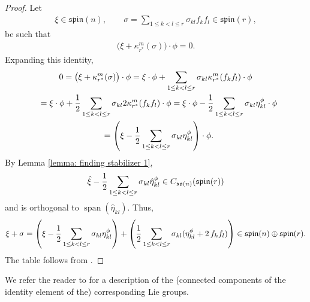 \documentclass[10pt,a4paper]{amsart}
\numberwithin{equation}{section}
\begin{document}
\begin{proof} Let
\begin{gather*}
 \xi \in \mathfrak{spin}(n),\qquad
 \sigma = \sum_{1\leq k<l\leq r} \sigma_{kl}f_kf_l \in\mathfrak{spin}(r),
\end{gather*}
be such that
\begin{gather*}\big(\xi+\kappa_{r^*}^{m} (\sigma)\big)\cdot \phi =0.\end{gather*}
Expanding this identity,
\begin{gather*}
 0 = \big(\xi+\kappa_{r^*}^{m} (\sigma)\big)\cdot \phi =
 \xi\cdot\phi + \sum_{1\leq k<l\leq r} \sigma_{kl}\kappa_{r^*}^{m}(f_kf_l)\cdot\phi\\
 \hphantom{0}{} =
 \xi\cdot\phi + {1\over 2}\sum_{1\leq k<l\leq r} \sigma_{kl}2\kappa_{r^*}^{m}(f_kf_l)\cdot\phi =
 \xi\cdot\phi - {1\over 2}\sum_{1\leq k<l\leq r} \sigma_{kl}\eta_{kl}^\phi\cdot\phi\\
\hphantom{0}{} =
 \left(\xi - {1\over 2}\sum_{1\leq k<l\leq r} \sigma_{kl}\eta_{kl}^\phi\right)\cdot\phi.
\end{gather*}
By Lemma \ref{lemma: finding stabilizer 1},
\begin{gather*}\hat{\xi} - {1\over 2}\sum_{1\leq k<l\leq r} \sigma_{kl}\hat{\eta}_{kl}^\phi\in C_{\mathfrak{so}(n)}(\mathfrak{spin}(r))\end{gather*}
and is orthogonal to $\operatorname{span}(\hat{\eta}_{kl})$.
Thus,
\begin{gather*}\xi+\sigma = \left(\xi - {1\over 2}\sum_{1\leq k<l\leq r} \sigma_{kl}\eta_{kl}^\phi\right) + \left({1\over 2}\sum_{1\leq k<l\leq r} \sigma_{kl}(\eta_{kl}^\phi + 2\,f_kf_l)\right) \in \mathfrak{spin}(n)\oplus\mathfrak{spin}(r).\end{gather*}
The table follows from \cite[Theorems 3.1 and 3.2]{AH}.
\end{proof}

We refer the reader to \cite[Theorem 3.2]{AGH} for a description of the (connected components of the identity element of the) corresponding Lie groups.
\end{document}
